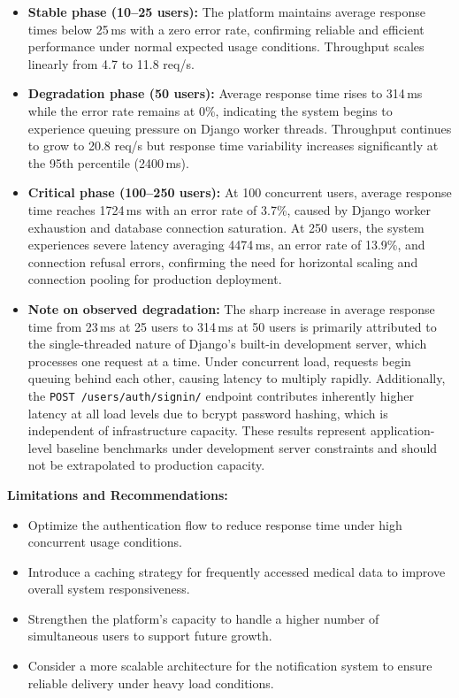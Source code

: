 \begin{itemize}
    \item \textbf{Stable phase  (10--25 users):} The platform maintains average
    response times below 25\,ms with a zero error rate, confirming reliable
    and efficient performance under normal expected usage conditions.
    Throughput scales linearly from 4.7 to 11.8 req/s.

    \item \textbf{Degradation phase (50 users):} Average response time rises
    to 314\,ms while the error rate remains at 0\%, indicating the system
    begins to experience queuing pressure on Django worker threads.
    Throughput continues to grow to 20.8 req/s but response time
    variability increases significantly at the 95th percentile (2400\,ms).

    \item \textbf{Critical phase (100--250 users):} At 100 concurrent users,
    average response time reaches 1724\,ms with an error rate of 3.7\%,
    caused by Django worker exhaustion and database connection saturation.
    At 250 users, the system experiences severe latency averaging 4474\,ms,
    an error rate of 13.9\%, and connection refusal errors, confirming
    the need for horizontal scaling and connection pooling for
    production deployment.

    \item \textbf{Note on observed degradation:} The sharp increase in average
    response time from 23\,ms at 25 users to 314\,ms at 50 users is
    primarily attributed to the single-threaded nature of Django's
    built-in development server, which processes one request at a time.
    Under concurrent load, requests begin queuing behind each other,
    causing latency to multiply rapidly. Additionally, the
    \texttt{POST /users/auth/signin/} endpoint contributes inherently
    higher latency at all load levels due to bcrypt password hashing,
    which is independent of infrastructure capacity. These results
    represent application-level baseline benchmarks under development
    server constraints and should not be extrapolated to production capacity.
\end{itemize}

\textbf{Limitations and Recommendations:}
\begin{itemize}
    \item Optimize the authentication flow to reduce response time
    under high concurrent usage conditions.
    \item Introduce a caching strategy for frequently accessed medical
    data to improve overall system responsiveness.
    \item Strengthen the platform's capacity to handle a higher number
    of simultaneous users to support future growth.
    \item Consider a more scalable architecture for the notification
    system to ensure reliable delivery under heavy load conditions.
\end{itemize}

